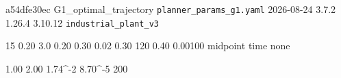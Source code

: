 %
%
%
%

\providecommand{\resdef}[2]{\expandafter\def\csname #1\endcsname{#2}}

\providecommand{\restabdir}{tab}
\providecommand{\restab}[1]{}

\resdef{resCommit}{a54dfe30ec} %
\resdef{resBranch}{G1\_optimal\_trajectory} %
\resdef{resProfile}{\texttt{planner\_params\_g1.yaml}} %
\resdef{resDate}{2026-08-24} %
\resdef{resCasadi}{3.7.2}
\resdef{resNumpy}{1.26.4}
\resdef{resPython}{3.10.12}
\resdef{resBag}{\texttt{industrial\_plant\_v3}} %

\resdef{resN}{15}              %
\resdef{resDt}{0.20}           %
\resdef{resHorizonSeconds}{3.0} %
\resdef{resVref}{0.20}         %
\resdef{resVxMax}{0.30}
\resdef{resVyMax}{0.02}
\resdef{resOmegaMax}{0.30}
\resdef{resWobsDep}{120}       %
\resdef{resObsRDep}{0.40}      %
\resdef{resTauV}{0.00100}      %
\resdef{resIntegrator}{midpoint}
\resdef{resPathMode}{time}
\resdef{resTerminalMode}{none}

\resdef{resOrderEuler}{1.00}   %
\resdef{resOrderMidpoint}{2.00} %
\resdef{resErrEulerDep}{1.74^{-2}} %
\resdef{resErrMidpointDep}{8.70\times 10^{-5}}
\resdef{resIntegratorGain}{200} %

